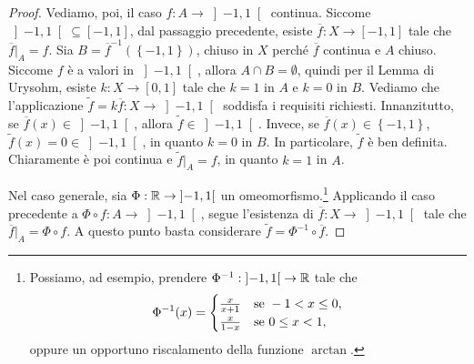 \begin{proof}
	Vediamo, poi, il caso $f:A \to \left] -1,1\right[ $ continua. Siccome $\left] -1,1\right[ \subseteq [-1,1]$, dal passaggio precedente, esiste $\overline{f}: X \to [-1,1]$ tale che $\overline{f}|_A = f$. Sia $B= \overline{f}^{-1}(\left\lbrace -1,1\right\rbrace )$, chiuso in $X$ perché $\overline{f}$ continua e $A$ chiuso. Siccome $f$ è a valori in $\left] -1,1\right[$, allora $A \cap B = \emptyset$, quindi per il Lemma di Urysohm, esiste $k : X \to [0,1]$ tale che $k=1$ in $A$ e $k=0$ in $B$. Vediamo che l'applicazione $\tilde{f} = k\overline{f}: X \to \left] -1,1\right[$ soddisfa i requisiti richiesti. Innanzitutto, se $\overline{f}(x) \in \left] -1,1\right[ $, allora $\tilde{f} \in \left] -1,1\right[$. Invece, se $\overline{f}(x) \in \left\lbrace -1,1\right\rbrace$, $\tilde{f}(x) = 0 \in \left] -1,1\right[$, in quanto $k=0$ in $B$. In particolare, $\tilde{f}$ è ben definita. Chiaramente è poi continua e $\tilde{f}|_A = f$, in quanto $k = 1$ in $A$.
	
	Nel caso generale, sia $\Phi: \mathbb{R} \to \left] -1,1\right[$ un omeomorfismo.\footnote{Possiamo, ad esempio, prendere $\Phi^{-1}:\left] -1,1\right[ \to \mathbb{R}$ tale che
		\[ \Phi^{-1}(x)= \begin{cases}
			\frac{x}{x+1} & \textup{se } -1<x\le 0,\\
			\frac{x}{1-x} & \textup{se } 0\le x< 1,\\
		\end{cases} \]
		oppure un opportuno riscalamento della funzione $\arctan$.
	} Applicando il caso precedente a  $ \Phi\circ f: A \to \left] -1,1\right[$, segue l'esistenza di $\overline{f}: X \to \left] -1,1\right[$ tale che $\overline{f}|_A = \Phi\circ f$. A questo punto basta considerare $\tilde{f} = \Phi^{-1}\circ \overline{f}$.
\end{proof}

